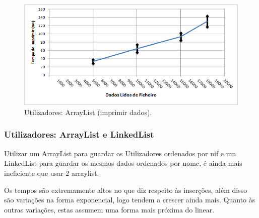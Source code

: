 \documentclass[a5paper,twocolumn, 11pt]{article}
\begin{document}
\begin{figure}[h!b!t!]
    \caption[Utilizadores: ArrayList (imprimir dados)]{Utilizadores: ArrayList (imprimir dados).}
    \label{hashtable}
    \centering
        \includegraphics[width=400pt]{user_c1_o5.png}
\end{figure}

\newpage
\twocolumn
\subsubsection[Utilizadores:\\ArrayList e LinkedList]{Utilizadores: \vbox{ArrayList e LinkedList}}
Utilizar um ArrayList para guardar os Utilizadores ordenados por nif e um LinkedList para guardar os mesmos dados ordenados por nome, é ainda mais ineficiente que usar 2 arraylist.

Os tempos são extremamente altos no que diz respeito às inserções, além disso são variações na forma exponencial, logo tendem a crescer ainda mais.
Quanto às outras variações, estas assumem uma forma mais próxima do linear.
\end{document}
